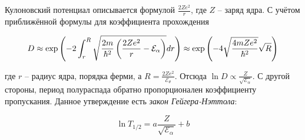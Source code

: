 Кулоновский потенциал описывается формулой $\frac{2 Z e^2}{r}$, где $Z$ -- заряд ядра. С учётом приближённой формулы для коэффициента прохождения

\begin{equation}
    D \approx \exp \left( - 2 \int_r^R \sqrt{\frac{2 m}{\hbar^2} \left( \frac{2 Z e^2}{r} - \mathcal{E}_\alpha \right)} dr \right) \approx \exp \left( - 4 \sqrt{\frac{4 m Z e^2}{\hbar^2}} \sqrt{R} \right)
\end{equation}

\noindent
где $r$ -- радиус ядра, порядка ферми, а $R = \frac{2 Z e^2}{\mathcal{E}_\theta}$. Отсюда $\ln D \propto \frac{Z}{\sqrt{\mathcal{E}_\alpha}}$. С другой стороны, период полураспада обратно пропорционален коэффициенту пропускания. Данное утверждение есть \textit{закон Гейгера-Нэттола}:

\begin{equation}
    \ln T_{1 / 2} = a \frac{Z}{\sqrt{\mathcal{E}_\alpha}} + b
\end{equation}